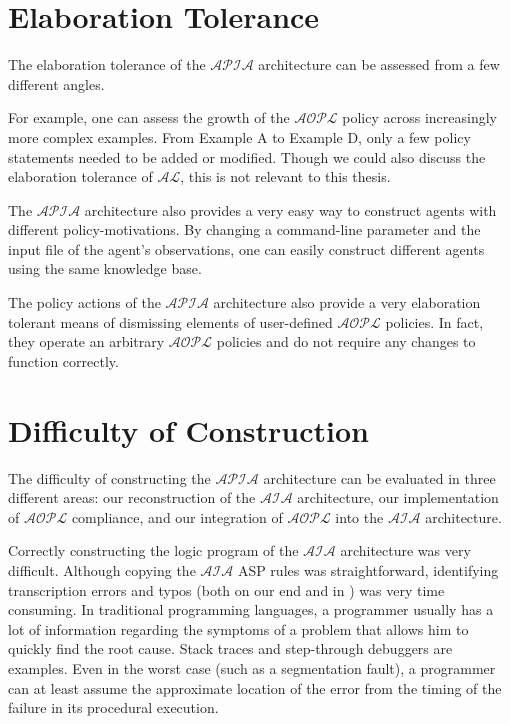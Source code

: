 \section{Elaboration Tolerance}

The elaboration tolerance of the $\mathcal{APIA}$ architecture can be assessed from a few different angles.

For example, one can assess the growth of the $\mathcal{AOPL}$ policy across increasingly more complex examples.
From Example A to Example D, only a few policy statements needed to be added or modified.
Though we could also discuss the elaboration tolerance of $\mathcal{AL}$, this is not relevant to this thesis.

The $\mathcal{APIA}$ architecture also provides a very easy way to construct agents with different policy-motivations.
By changing a command-line parameter and the input file of the agent's observations, one can easily construct different agents using the same knowledge base.

The policy actions of the $\mathcal{APIA}$ architecture also provide a very elaboration tolerant means of dismissing elements of user-defined $\mathcal{AOPL}$ policies.
In fact, they operate an arbitrary $\mathcal{AOPL}$ policies and do not require any changes to function correctly.

\section{Difficulty of Construction}

The difficulty of constructing the $\mathcal{APIA}$ architecture can be evaluated in three different areas: our reconstruction of the $\mathcal{AIA}$ architecture, our implementation of $\mathcal{AOPL}$ compliance, and our integration of $\mathcal{AOPL}$ into the $\mathcal{AIA}$ architecture.

Correctly constructing the logic program of the $\mathcal{AIA}$ architecture was very difficult.
Although copying the $\mathcal{AIA}$ ASP rules was straightforward, identifying transcription errors and typos (both on our end and in \citet{blount_architecture_2013}) was very time consuming.
In traditional programming languages, a programmer usually has a lot of information regarding the symptoms of a problem that allows him to quickly find the root cause.
Stack traces and step-through debuggers are examples.
Even in the worst case (such as a segmentation fault), a programmer can at least assume the approximate location of the error from the timing of the failure in its procedural execution.


